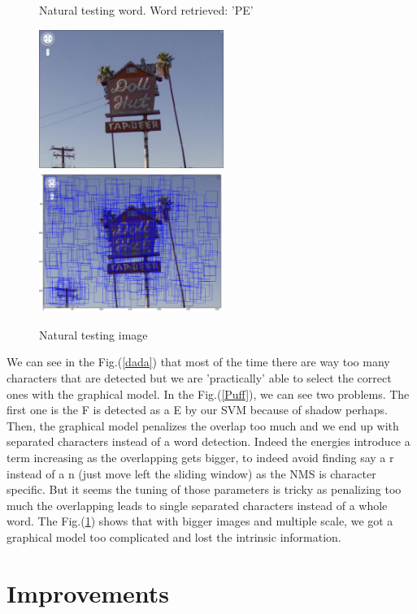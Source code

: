 \documentclass[10pt,a4paper]{article}
\begin{document}
\begin{figure}[ht!c]
\caption{Natural testing word. Word retrieved: 'PE'}%
\label{Puff}
\vspace{0.5cm}
\centering
\includegraphics[width=6cm]{figures/00_00.jpg}
\hspace{0.3cm}
\includegraphics[width=6cm]{figures/beerResized.png}%
\caption{Natural testing image}%
\label{beer}
\end{figure}

We can see in the Fig.(\ref{dada}) that most of the time there are way too many characters that are detected but we are 'practically' able to select the correct ones with the graphical model. In the Fig.(\ref{Puff}), we can see two problems. The first one is the F is detected as a E by our SVM because of shadow perhaps. Then, the graphical model penalizes the overlap too much and we end up with separated characters instead of a word detection. Indeed the energies introduce a term increasing as the overlapping gets bigger, to indeed avoid finding say a r instead of a n (just move left the sliding window) as the NMS is character specific. But it seems the tuning of those parameters is tricky as penalizing too much the overlapping leads to single separated characters instead of a whole word. The Fig.(\ref{beer}) shows that with bigger images and multiple scale, we got a graphical model too complicated and lost the intrinsic information.


\section{Improvements}
\end{document}
